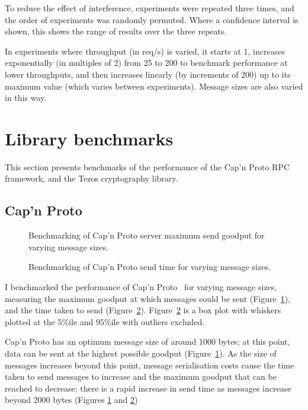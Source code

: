 To reduce the effect of interference, experiments were repeated three times, and the order of experiments was randomly permuted. Where a confidence interval is shown, this shows the range of results over the three repeats.

In experiments where throughput (in req/s) is varied, it starts at 1, increases exponentially (in multiples of 2) from 25 to 200 to benchmark performance at lower throughputs, and then increases linearly (by increments of 200) up to its maximum value (which varies between experiments). Message sizes are also varied in this way.

\section{Library benchmarks} \label{librarybenchmarks}
This section presents benchmarks of the performance of the Cap'n Proto RPC framework, and the Tezos cryptography library.

\subsection{Cap'n Proto} \label{capnpbenchmark}

\begin{figure}[h!]
\centering
\resizebox{.6\textwidth}{!}{}
\caption{Benchmarking of Cap'n Proto server maximum send goodput for varying message sizes.}
\label{sizegoodput}
\end{figure}

\begin{figure}[h!]
\centering
\resizebox{.6\textwidth}{!}{}
\caption{Benchmarking of Cap'n Proto send time for varying message sizes.}
\label{sizesendtime}
\end{figure}

I benchmarked the performance of Cap'n Proto~\cite{capnp} for varying message sizes, measuring the maximum goodput at which messages could be sent (Figure~\ref{sizegoodput}), and the time taken to send (Figure~\ref{sizesendtime}). Figure~\ref{sizesendtime} is a box plot with whiskers plotted at the 5\%ile and 95\%ile with outliers excluded.

Cap'n Proto has an optimum message size of around 1000 bytes; at this point, data can be sent at the highest possible goodput (Figure~\ref{sizegoodput}). As the size of messages increases beyond this point, message serialisation costs cause the time taken to send messages to increase and the maximum goodput that can be reached to decrease; there is a rapid increase in send time as messages increase beyond 2000 bytes (Figures \ref{sizegoodput} and \ref{sizesendtime})

